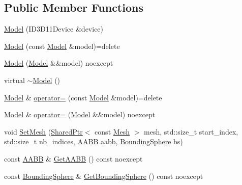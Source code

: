 \subsection*{Public Member Functions}
\begin{DoxyCompactItemize}
\item 
\mbox{\hyperlink{classmage_1_1rendering_1_1_model_a7f135a6ed7604655e94d3264bd9d5c62}{Model}} (I\+D3\+D11\+Device \&device)
\item 
\mbox{\hyperlink{classmage_1_1rendering_1_1_model_a59a64dc710efaa44b9f256883d0ab9cb}{Model}} (const \mbox{\hyperlink{classmage_1_1rendering_1_1_model}{Model}} \&model)=delete
\item 
\mbox{\hyperlink{classmage_1_1rendering_1_1_model_a550ece2d159145d9e9549e48235d1ca1}{Model}} (\mbox{\hyperlink{classmage_1_1rendering_1_1_model}{Model}} \&\&model) noexcept
\item 
virtual \mbox{\hyperlink{classmage_1_1rendering_1_1_model_a8fd12c516788a98ce5109aee41d834b8}{$\sim$\+Model}} ()
\item 
\mbox{\hyperlink{classmage_1_1rendering_1_1_model}{Model}} \& \mbox{\hyperlink{classmage_1_1rendering_1_1_model_aa7edda6386fa2ae0638e5c46dccff016}{operator=}} (const \mbox{\hyperlink{classmage_1_1rendering_1_1_model}{Model}} \&model)=delete
\item 
\mbox{\hyperlink{classmage_1_1rendering_1_1_model}{Model}} \& \mbox{\hyperlink{classmage_1_1rendering_1_1_model_a2b374cb908e39da8ff35ea5c17ce640d}{operator=}} (\mbox{\hyperlink{classmage_1_1rendering_1_1_model}{Model}} \&\&model) noexcept
\item 
void \mbox{\hyperlink{classmage_1_1rendering_1_1_model_acc0b3d63c2a02d5fe61539e21b181111}{Set\+Mesh}} (\mbox{\hyperlink{namespacemage_a1e01ae66713838a7a67d30e44c67703e}{Shared\+Ptr}}$<$ const \mbox{\hyperlink{classmage_1_1rendering_1_1_mesh}{Mesh}} $>$ mesh, std\+::size\+\_\+t start\+\_\+index, std\+::size\+\_\+t nb\+\_\+indices, \mbox{\hyperlink{classmage_1_1_a_a_b_b}{A\+A\+BB}} aabb, \mbox{\hyperlink{classmage_1_1_bounding_sphere}{Bounding\+Sphere}} bs)
\item 
const \mbox{\hyperlink{classmage_1_1_a_a_b_b}{A\+A\+BB}} \& \mbox{\hyperlink{classmage_1_1rendering_1_1_model_a05a767ef1551aa4c09c223d8f2311855}{Get\+A\+A\+BB}} () const noexcept
\item 
const \mbox{\hyperlink{classmage_1_1_bounding_sphere}{Bounding\+Sphere}} \& \mbox{\hyperlink{classmage_1_1rendering_1_1_model_a8885748932b52ec2d5bde368db6a130d}{Get\+Bounding\+Sphere}} () const noexcept
\item 

\end{DoxyCompactItemize}

